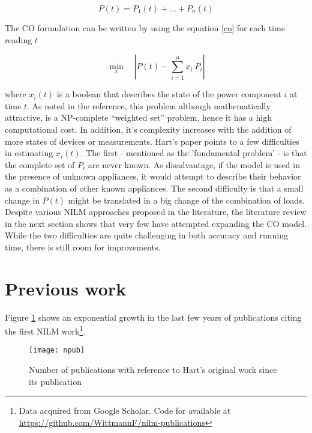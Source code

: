 $$P(t) = P_1(t) + ... + P_n(t)$$
 
The CO formulation can be written by using the equation \ref{co} for each time reading $t$ 

\begin{equation} \label{co}
    \min_{x} \quad \left|P(t) - \sum_{i=1}^{n} x_i\ P_i \right|
\end{equation}

where $x_i(t)$ is a boolean that describes the state of the power component $i$ at time $t$. As noted in the reference, this problem although mathematically attractive, is a NP-complete “weighted set” problem, hence it has a high computational cost. In addition, it's complexity increases with the addition of more states of devices or measurements.
Hart's paper points to a few difficulties in estimating $x_i(t)$. The first - mentioned as the 'fundamental problem' - is that the complete set of $P_i$ are never known. As disadvantage, if the model is used in the presence of unknown appliances, it would attempt to describe their behavior as a combination of other known appliances. 
The second difficulty is that a small change in $P(t)$ might be translated in a big change of the combination of loads. Despite various NILM approaches proposed in the literature, the literature review in the next section shows that very few have attempted expanding the CO model. While the two difficulties are quite challenging in both accuracy and running time, there is still room for improvements. 

\section{Previous work}

Figure \ref{1npub} shows an exponential growth in the last few years of publications citing the first NILM work\footnote{Data acquired from Google Scholar. Code for available at \url{https://github.com/WittmannF/nilm-publications}}.

\begin{figure}[ht]
    \centering
    \texttt{[image: npub]}
    \caption{Number of publications with reference to Hart's original work since its publication}
    \label{1npub}
\end{figure}



